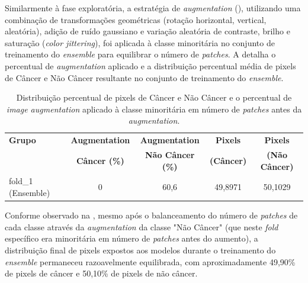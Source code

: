 Similarmente à fase exploratória, a estratégia de \textit{augmentation} (), utilizando uma combinação de transformações geométricas (rotação horizontal, vertical, aleatória), adição de ruído gaussiano e variação aleatória de contraste, brilho e saturação (\textit{color jittering}), foi aplicada à classe minoritária no conjunto de treinamento do \textit{ensemble} para equilibrar o número de \textit{patches}. A  detalha o percentual de \textit{augmentation} aplicado e a distribuição percentual média de pixels de Câncer e Não Câncer resultante no conjunto de treinamento do \textit{ensemble}.

\begin{table}[!htb]
\centering
\caption[Distribuição de pixels e percentual de augmentation para o fold do ensemble.]{Distribuição percentual de pixels de Câncer e Não Câncer e o percentual de \textit{image augmentation} aplicado à classe minoritária em número de \textit{patches} antes da \textit{augmentation}.}
\label{tab:distribuicao_pixels_augmentation_ensemble}
\begin{tabular}{l S[table-format=1.0] S[table-format=2.1] S[table-format=2.4] S[table-format=2.4]}
\toprule
\textbf{Grupo} & {\textbf{Augmentation}} & {\textbf{Augmentation}} & {\textbf{Pixels}} & {\textbf{Pixels}} \\
               & {\textbf{Câncer (\%)}} & {\textbf{Não Câncer (\%)}} & {\textbf{(Câncer)}} & {\textbf{(Não Câncer)}} \\
\midrule
fold\_1 (Ensemble) & 0 & 60,6 & 49,8971 & 50,1029 \\
\bottomrule
\end{tabular}
\end{table}

Conforme observado na , mesmo após o balanceamento do número de \textit{patches} de cada classe através da \textit{augmentation} da classe "Não Câncer" (que neste \textit{fold} específico era minoritária em número de \textit{patches} antes do aumento), a distribuição final de pixels expostos aos modelos durante o treinamento do \textit{ensemble} permaneceu razoavelmente equilibrada, com aproximadamente 49,90\% de pixels de câncer e 50,10\% de pixels de não câncer. 

